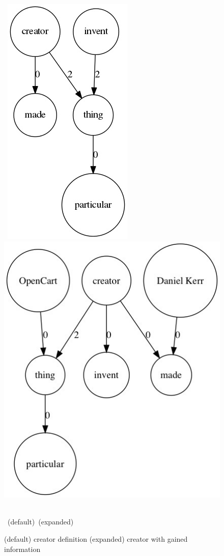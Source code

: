 \documentclass[twoside,b5paper,10pt]{article}
\begin{document}
\begin{figure}[htb]
  \vspace{3pt}
  \centerline{
  \hbox{
  \hspace{0.0in}
        \includegraphics[scale=0.5]{Figure/creator.jpg}
        \hspace{0.1\columnwidth}
        \includegraphics[scale=0.5]{Figure/creatornew.jpg}
    }
  }
  \vspace{3pt}
  \hbox{\hspace{0.13\columnwidth} (default) \hspace{0.3\columnwidth} (expanded)}
  \caption{ (default) creator definition (expanded) creator with gained information}
  \label{fig:creator}
\end{figure}
\end{document}
